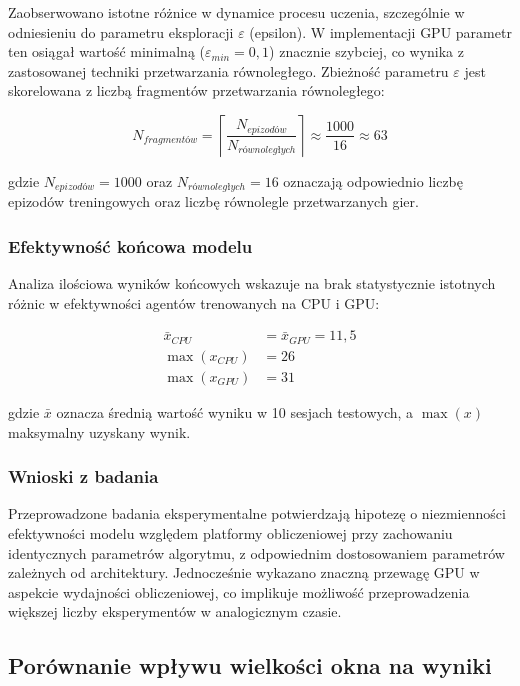 \documentclass[a4paper,12pt]{article}
\begin{document}
Zaobserwowano istotne różnice w dynamice procesu uczenia, szczególnie w odniesieniu do parametru eksploracji \(\varepsilon\) (epsilon). W implementacji GPU parametr ten osiągał wartość minimalną (\(\varepsilon_{min} = 0,1\)) znacznie szybciej, co wynika z zastosowanej techniki przetwarzania równoległego. Zbieżność parametru \(\varepsilon\) jest skorelowana z liczbą fragmentów przetwarzania równoległego:

\begin{equation}
N_{fragmentów} = \left\lceil \frac{N_{epizodów}}{N_{równoległych}} \right\rceil \approx \frac{1000}{16} \approx 63
\end{equation}

\noindent gdzie \(N_{epizodów}=1000\) oraz \(N_{równoległych}=16\) oznaczają odpowiednio liczbę epizodów treningowych oraz liczbę równolegle przetwarzanych gier.

\subsubsection{Efektywność końcowa modelu}

Analiza ilościowa wyników końcowych wskazuje na brak statystycznie istotnych różnic w efektywności agentów trenowanych na CPU i GPU:

\begin{align}
\bar{x}_{CPU} &= \bar{x}_{GPU} = 11,5 \\
\max(x_{CPU}) &= 26 \\
\max(x_{GPU}) &= 31
\end{align}

\noindent gdzie \(\bar{x}\) oznacza średnią wartość wyniku w 10 sesjach testowych, a \(\max(x)\) maksymalny uzyskany wynik.
\subsubsection{Wnioski z badania}

Przeprowadzone badania eksperymentalne potwierdzają hipotezę o niezmienności efektywności modelu względem platformy obliczeniowej przy zachowaniu identycznych parametrów algorytmu, z odpowiednim dostosowaniem parametrów zależnych od architektury. Jednocześnie wykazano znaczną przewagę GPU w aspekcie wydajności obliczeniowej, co implikuje możliwość przeprowadzenia większej liczby eksperymentów w analogicznym czasie.

\clearpage
\subsection{Porównanie wpływu wielkości okna na wyniki}
\end{document}
